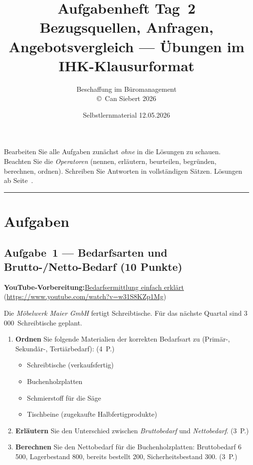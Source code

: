 \documentclass[11pt, a4paper]{article}
\title{\vspace*{-1.5cm}\Huge\bfseries\color{bfwPrimaryDark}Aufgabenheft Tag~2\\[0.4em]
  \large\color{bfwInkSoft}\textnormal{Bezugsquellen, Anfragen, Angebotsvergleich --- Übungen im IHK-Klausurformat}}
\author{\textsf{Beschaffung im Büromanagement}\\
\textsf{\small\copyright\ Can Siebert\,\textperiodcentered\,2026}}
\date{Selbstlernmaterial \textperiodcentered{} 12.05.2026}
\begin{document}
\maketitle
\thispagestyle{empty}

\begin{merksatz}[title={\bfseries So nutzen Sie dieses Aufgabenheft}]
Bearbeiten Sie alle Aufgaben zunächst \emph{ohne} in die Lösungen zu schauen.
Beachten Sie die \emph{Operatoren} (nennen, erläutern, beurteilen, begründen,
berechnen, ordnen). Schreiben Sie Antworten in vollständigen Sätzen.
Lösungen ab Seite~\pageref{loesungen}.
\end{merksatz}

\tableofcontents
\vspace{1em}
\hrule

\section{Aufgaben}

\subsection*{Aufgabe~1 --- Bedarfsarten und Brutto-/Netto-Bedarf (10 Punkte)}

\noindent\textbf{\color{bfwAccent}YouTube-Vorbereitung:}\enspace \href{https://www.youtube.com/watch?v=w31S8KZp1Mg}{Bedarfsermittlung einfach erklärt} (\url{https://www.youtube.com/watch?v=w31S8KZp1Mg})

\medskip
Die \emph{Möbelwerk Maier GmbH} fertigt Schreibtische. Für das nächste Quartal sind
3\,000~Schreibtische geplant.

\begin{enumerate}[label=(\alph*)]
  \item \textbf{Ordnen} Sie folgende Materialien der korrekten Bedarfsart zu (Primär-, Sekundär-, Tertiärbedarf): \hfill (4~P.)
    \begin{itemize}[leftmargin=*]
      \item Schreibtische (verkaufsfertig)
      \item Buchenholzplatten
      \item Schmierstoff für die Säge
      \item Tischbeine (zugekaufte Halbfertigprodukte)
    \end{itemize}
  \item \textbf{Erläutern} Sie den Unterschied zwischen \emph{Bruttobedarf} und \emph{Nettobedarf}. \hfill (3~P.)
  \item \textbf{Berechnen} Sie den Nettobedarf für die Buchenholzplatten: Bruttobedarf 6\,500, Lagerbestand 800, bereits bestellt 200, Sicherheitsbestand 300. \hfill (3~P.)
\end{enumerate}
\end{document}
